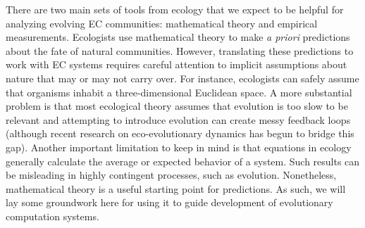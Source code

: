 There are two main sets of tools from ecology that we expect to be helpful for analyzing evolving EC communities: mathematical theory and empirical measurements.
Ecologists use mathematical theory to make \textit{a priori} predictions about the fate of natural communities.  However, translating these predictions to work with EC systems requires careful attention to implicit assumptions about nature that may or may not carry over. For instance, ecologists can safely assume that organisms inhabit a three-dimensional Euclidean space. %
A more substantial problem is that most ecological theory assumes that
evolution is too slow
to be relevant and attempting to introduce evolution can create messy feedback loops (although recent research on eco-evolutionary dynamics has begun to bridge this gap).
Another important limitation to keep in mind is that equations in ecology generally calculate the average or expected behavior of a system. Such results can be misleading in highly contingent processes, such as evolution.
Nonetheless, mathematical theory is a useful starting point for predictions. As such, we will lay some groundwork here for using it to guide development of evolutionary computation systems.

